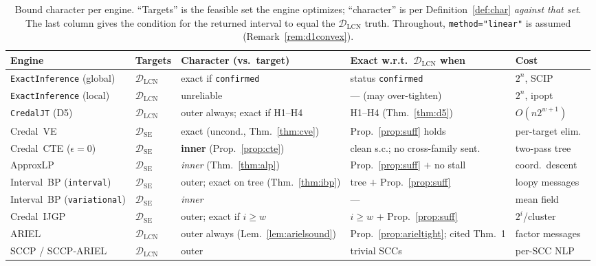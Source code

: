 \documentclass[11pt]{article}
\theoremstyle{definition}
\newcommand{\DSE}{\mathcal{D}_{\mathrm{SE}}}
\newcommand{\DLCN}{\mathcal{D}_{\mathrm{LCN}}}
\begin{document}
\begin{table}[ht]\centering\footnotesize
\caption{Bound character per engine. ``Targets'' is the feasible set the engine optimizes;
``character'' is per Definition~\ref{def:char} \emph{against that set}. The last column gives the
condition for the returned interval to equal the $\DLCN$ truth. Throughout,
\texttt{method="linear"} is assumed (Remark~\ref{rem:d1convex}).}\label{tab:master}
\setlength{\tabcolsep}{4pt}
\begin{tabular}{@{}lllll@{}}
\toprule
Engine & Targets & Character (vs.\ target) & Exact w.r.t.\ $\DLCN$ when & Cost \\
\midrule
\texttt{ExactInference} (global) & $\DLCN$ & exact if \texttt{confirmed} & status \texttt{confirmed} & $2^n$, SCIP \\
\texttt{ExactInference} (local)  & $\DLCN$ & unreliable & --- (may over-tighten) & $2^n$, ipopt \\
\texttt{CredalJT} (D5)           & $\DLCN$ & outer always; exact if H1--H4 & H1--H4 (Thm.~\ref{thm:d5}) & $O(n2^{w+1})$ \\
\midrule
Credal~VE                        & $\DSE$ & exact (uncond., Thm.~\ref{thm:cve}) & Prop.~\ref{prop:suff} holds & per-target elim.\ \\
Credal~CTE ($\epsilon{=}0$)      & $\DSE$ & \textbf{inner} (Prop.~\ref{prop:cte}) & clean s.c.; no cross-family sent. & two-pass tree \\
ApproxLP                         & $\DSE$ & \emph{inner} (Thm.~\ref{thm:alp}) & Prop.~\ref{prop:suff} $+$ no stall & coord.\ descent \\
Interval~BP (\texttt{interval})  & $\DSE$ & outer; exact on tree (Thm.~\ref{thm:ibp}) & tree $+$ Prop.~\ref{prop:suff} & loopy messages \\
Interval~BP (\texttt{variational})& $\DSE$ & \emph{inner} & --- & mean field \\
Credal~IJGP                      & $\DSE$ & outer; exact if $i\ge w$ & $i\ge w$ $+$ Prop.~\ref{prop:suff} & $2^i$/cluster \\
\midrule
ARIEL                            & $\DLCN$ & outer always (Lem.~\ref{lem:arielsound}) & Prop.~\ref{prop:arieltight}; cited Thm.~1 & factor messages \\
SCCP / SCCP-ARIEL                & $\DLCN$ & outer & trivial SCCs & per-SCC NLP \\
\bottomrule
\end{tabular}
\end{table}
\end{document}
